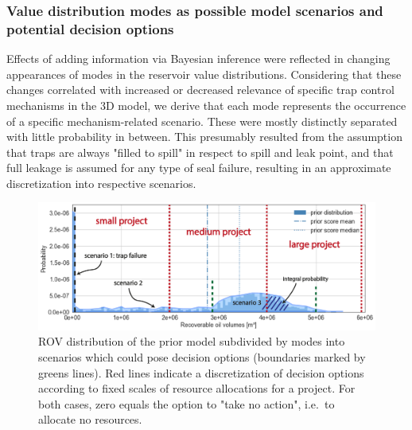 	\subsubsection{Value distribution modes as possible model scenarios and potential decision options}	
	Effects of adding information via Bayesian inference were reflected in changing appearances of modes in the reservoir value distributions. Considering that these changes correlated with increased or decreased relevance of specific trap control mechanisms in the 3D model, we derive that each mode represents the occurrence of a specific mechanism-related scenario. These were mostly distinctly separated with little probability in between. This presumably resulted from the assumption that traps are always "filled to spill" in respect to spill and leak point, and that full leakage is assumed for any type of seal failure, resulting in an approximate discretization into respective scenarios.
	\begin{figure}[h]
		\centering
		\includegraphics[width=1\textwidth]{Figures/scenarios_options}
		\caption{ROV distribution of the prior model subdivided by modes into scenarios which could pose decision options (boundaries marked by greens lines). Red lines indicate a discretization of decision options according to fixed scales of resource allocations for a project. For both cases, zero equals the option to "take no action", i.e.\ to allocate no resources.}\label{fig:scenarios_options}
	\end{figure}\\
